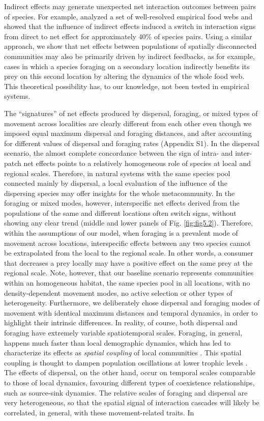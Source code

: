 Indirect effects may generate unexpected net interaction outcomes between pairs of species. For example, \cite{Montoya2009a} analyzed a set of well-resolved empirical food webs and showed that the influence of indirect effects induced a switch in interaction signs from direct to net effect for approximately 40\% of species pairs. Using a similar approach, we show that net effects between populations of spatially disconnected communities may also be primarily driven by indirect feedbacks, as for example, cases in which a species foraging on a secondary location indirectly benefits its prey on this second location by altering the dynamics of the whole food web. This theoretical possibility has, to our knowledge, not been tested in empirical systems.

The ``signatures'' of net effects produced by dispersal, foraging, or mixed types of movement across localities are clearly different from each other \citep{Amarasekare2008} even though we imposed equal maximum dispersal and foraging distances, and after accounting for different values of dispersal and foraging rates (Appendix S1). In the dispersal scenario, the almost complete concordance between the sign of intra- and inter-patch net effects points to a relatively homogeneous role of species at local and regional scales. Therefore, in natural systems with the same species pool connected mainly by dispersal, a local evaluation of the influence of the dispersing species may offer insights for the whole metacommunity. In the foraging or mixed modes, however, interspecific net effects derived from the populations of the same and different locations often switch signs, without showing any clear trend (middle and lower panels of Fig. \ref{fig:fig5.2}). Therefore, within the assumptions of our model, when foraging is a prevalent mode of movement across locations, interspecific effects between any two species cannot be extrapolated from the local to the regional scale. In other words, a consumer that decreases a prey locally may have a positive effect on the same prey at the regional scale. Note, however, that our baseline scenario represents communities within an homogeneous habitat, the same species pool in all locations, with no density-dependent movement modes, no active selection or other types of heterogeneity. Furthermore, we deliberately chose dispersal and foraging modes of movement with identical maximum distances and temporal dynamics, in order to highlight their intrinsic differences. In reality, of course, both dispersal and foraging have extremely variable spatiotemporal scales. Foraging, in general, happens much faster than local demographic dynamics, which has led to characterize its effects as \textit{spatial coupling} of local communities \citep{Massol2011}. This spatial coupling is thought to dampen population oscillations at lower trophic levels \citep{McCann2005}. The effects of dispersal, on the other hand, occur on temporal scales comparable to those of local dynamics, favouring different types of coexistence relationships, such as source-sink dynamics. The relative scales of foraging and dispersal are very heterogeneous, so that the spatial signal of interaction cascades will likely be correlated, in general, with these movement-related traits. In 